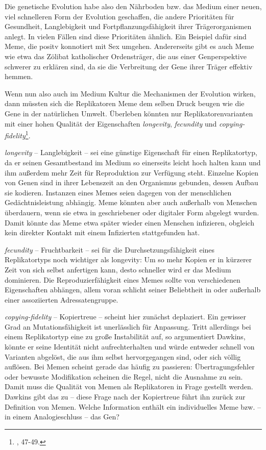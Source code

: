\documentclass[openany,twoside,twocolumn]{book}
\let\rmarkdownfootnote\footnote%
\def\footnote{\protect\rmarkdownfootnote}
\begin{document}
Die genetische Evolution habe also den Nährboden bzw. das Medium einer
neuen, viel schnelleren Form der Evolution geschaffen, die andere
Prioritäten für Gesundheit, Langlebigkeit und Fortpflanzungsfähigkeit
ihrer Trägerorganismen anlegt. In vielen Fällen sind diese Prioritäten
ähnlich. Ein Beispiel dafür sind Meme, die positv konnotiert mit Sex
umgehen. Andererseits gibt es auch Meme wie etwa das Zölibat
katholischer Ordensträger, die aus einer Genperspektive schwerer zu
erklären sind, da sie die Verbreitung der Gene ihrer Träger effektiv
hemmen.

Wenn nun also auch im Medium Kultur die Mechanismen der Evolution
wirken, dann müssten sich die Replikatoren Meme dem selben Druck beugen
wie die Gene in der natürlichen Umwelt. Überleben könnten nur
Replikatorenvarianten mit einer hohen Qualität der Eigenschaften
\emph{longevity}, \emph{fecundity} und \emph{copying-fidelity}\footnote{\textcite{Dawkinsselfishgene40th2016},
  47-49.}.

\emph{longevity} -- Langlebigkeit -- sei eine günstige Eigenschaft für
einen Replikatortyp, da er seinen Gesamtbestand im Medium so einerseits
leicht hoch halten kann und ihm außerdem mehr Zeit für Reproduktion zur
Verfügung steht. Einzelne Kopien von Genen sind in ihrer Lebenszeit an
den Organismus gebunden, dessen Aufbau sie kodieren. Instanzen eines
Memes seien dagegen von der menschlichen Gedächtnisleistung abhängig.
Meme könnten aber auch außerhalb von Menschen überdauern, wenn sie etwa
in geschriebener oder digitaler Form abgelegt wurden. Damit könnte das
Meme etwa später wieder einen Menschen infizieren, obgleich kein
direkter Kontakt mit einem Infizierten stattgefunden hat.

\emph{fecundity} -- Fruchtbarkeit -- sei für die Durchsetzungsfähigkeit
eines Replikatortyps noch wichtiger als longevity: Um so mehr Kopien er
in kürzerer Zeit von sich selbst anfertigen kann, desto schneller wird
er das Medium dominieren. Die Reproduzierfähigkeit eines Memes sollte
von verschiedenen Eigenschaften abhängen, allem voran schlicht seiner
Beliebtheit in oder außerhalb einer assoziierten Adressatengruppe.

\emph{copying-fidelity} -- Kopiertreue -- scheint hier zunächst
deplaziert. Ein gewisser Grad an Mutationsfähigkeit ist unerlässlich für
Anpassung. Tritt allerdings bei einem Replikatortyp eine zu große
Instabilität auf, so argumentiert Dawkins, könnte er seine Identität
nicht aufrechterhalten und würde entweder schnell von Varianten
abgelöst, die aus ihm selbst hervorgegangen sind, oder sich völlig
auflösen. Bei Memen scheint gerade das häufig zu passieren:
Übertragungsfehler oder bewusste Modifikation scheinen die Regel, nicht
die Ausnahme zu sein. Damit muss die Qualität von Memen als Replikatoren
in Frage gestellt werden. Dawkins gibt das zu -- diese Frage nach der
Kopiertreue führt ihn zurück zur Definition von Memen. Welche
Information enthält ein individuelles Meme bzw. -- in einem
Analogieschluss -- das Gen?
\end{document}
